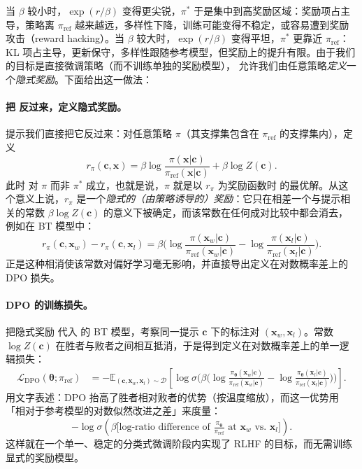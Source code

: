 当 $\beta$ 较小时，$\exp(r/\beta)$ 变得更尖锐，$\pi^*$ 于是集中到高奖励区域：奖励项占主导，策略离 $\pi_{\mathrm{ref}}$ 越来越远，多样性下降，训练可能变得不稳定，或容易遭到奖励攻击（reward hacking）。当 $\beta$ 较大时，$\exp(r/\beta)$ 变得平坦，$\pi^*$ 更靠近 $\pi_{\mathrm{ref}}$：KL 项占主导，更新保守，多样性跟随参考模型，但奖励上的提升有限。由于我们的目标是直接微调策略（而不训练单独的奖励模型）， 允许我们由任意策略\emph{定义}一个\textit{隐式奖励}。下面给出这一做法：
\paragraph{把  反过来，定义隐式奖励。}
 提示我们直接把它反过来：对任意策略 $\pi$（其支撑集包含在 $\pi_{\mathrm{ref}}$ 的支撑集内），定义
\begin{equation}\label{eq:implicit-reward}
r_{\pi}(\mathbf c,\mathbf x)
 =
\beta \log\frac{\pi(\mathbf x|\mathbf c)}{\pi_{\mathrm{ref}}(\mathbf x|\mathbf c)}
 + \beta \log Z(\mathbf c).
\end{equation}
此时  对 $\pi$ 而非 $\pi^*$ 成立，也就是说，$\pi$ 就是以 $r_{\pi}$ 为奖励函数时  的最优解。从这个意义上说，$r_{\pi}$ 是一个\emph{隐式的（由策略诱导的）奖励}：它只在相差一个与提示相关的常数 $\beta\log Z(\mathbf c)$ 的意义下被确定，而该常数在任何成对比较中都会消去，例如在 BT 模型中：
\[
r_{\pi}(\mathbf c,\mathbf x_w)-r_{\pi}(\mathbf c,\mathbf x_l)
=
\beta\Big(
\log\frac{\pi(\mathbf x_w|\mathbf c)}{\pi_{\mathrm{ref}}(\mathbf x_w|\mathbf c)}
-
\log\frac{\pi(\mathbf x_l|\mathbf c)}{\pi_{\mathrm{ref}}(\mathbf x_l|\mathbf c)}
\Big).
\]
正是这种相消使该常数对偏好学习毫无影响，并直接导出定义在对数概率差上的 DPO 损失。

\paragraph{DPO 的训练损失。}
把隐式奖励  代入  的 BT 模型，考察同一提示 $\mathbf c$ 下的标注对 $(\mathbf x_w,\mathbf x_l)$。常数 $\log Z(\mathbf c)$ 在胜者与败者之间相互抵消，于是得到定义在对数概率差上的单一逻辑损失：
\begin{align*}
\mathcal L_{\mathrm{DPO}}(\bm\theta;\pi_{\mathrm{ref}})
&=
-\mathbb E_{(\mathbf c,\mathbf x_w,\mathbf x_l)\sim\mathcal D} \left[
\log \sigma \Big(
\beta\big(
\log\frac{\pi_{\bm\theta}(\mathbf x_w|\mathbf c)}{\pi_{\mathrm{ref}}(\mathbf x_w|\mathbf c)}
-
\log\frac{\pi_{\bm\theta}(\mathbf x_l|\mathbf c)}{\pi_{\mathrm{ref}}(\mathbf x_l|\mathbf c)}
\big)
\Big)
\right].
\end{align*}
用文字表述：DPO 抬高了胜者相对败者的优势（按温度缩放），而这一优势用「相对于参考模型的对数似然改进之差」来度量：
\[
-\log \sigma \left(
  \beta
  \bigl[
    \text{log-ratio difference of }
    \tfrac{\pi_{\bm\theta}}{\pi_{\mathrm{ref}}}
    \text{ at } \mathbf x_w \text{ vs.\ } \mathbf x_l
  \bigr]
\right).
\]
这样就在一个单一、稳定的分类式微调阶段内实现了 RLHF 的目标，而无需训练显式的奖励模型。



